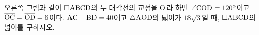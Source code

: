 \noindent\begin{minipage}[t]{0.58\linewidth}\vspace{0pt}\raggedright 오른쪽 그림과 같이 $\square\mathrm{ABCD}$의 두 대각선의 교점을 $\mathrm{O}$라 하면 $\angle\mathrm{COD}=120^\circ$이고 $\overline{\mathrm{OC}}=\overline{\mathrm{OD}}=6$이다. $\overline{\mathrm{AC}}+\overline{\mathrm{BD}}=40$이고 $\triangle\mathrm{AOD}$의 넓이가 $18\sqrt{3}$일 때, $\square\mathrm{ABCD}$의 넓이를 구하시오.\end{minipage}\hfill\begin{minipage}[t]{0.4\linewidth}\vspace{0pt}\centering \resizebox{\ifdim\width>\linewidth\linewidth\else\width\fi}{!}{}\end{minipage}\par
